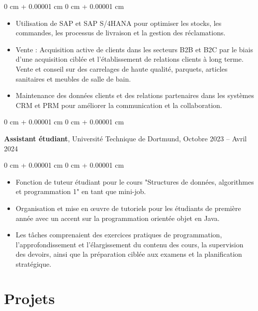 \documentclass[10pt, letterpaper]{article}
\newenvironment{highlights}{
    \begin{itemize}[
        topsep=0.10 cm,
        parsep=0.10 cm,
        partopsep=0pt,
        itemsep=0pt,
        leftmargin=0 cm + 10pt
    ]
}{
    \end{itemize}
} %
\newenvironment{onecolentry}{
    \begin{adjustwidth}{
        0 cm + 0.00001 cm
    }{
        0 cm + 0.00001 cm
    }
}{
    \end{adjustwidth}
} %
\newenvironment{twocolentry}[2][]{
    \onecolentry
    \def\secondColumn{#2}
    \setcolumnwidth{\fill, 4.5 cm}
    \begin{paracol}{2}
}{
    \switchcolumn \raggedleft \secondColumn
    \end{paracol}
    \endonecolentry
} %
\begin{document}
        \vspace{0.10 cm}
        \begin{onecolentry}
            \begin{highlights}
                \item Utilisation de SAP et SAP S/4HANA pour optimiser les stocks, les commandes, les processus de livraison et la gestion des réclamations.

               \item Vente : Acquisition active de clients dans les secteurs B2B et B2C par le biais d'une acquisition ciblée et l'établissement de relations clients à long terme. Vente et conseil sur des carrelages de haute qualité, parquets, articles sanitaires et meubles de salle de bain.

                \item Maintenance des données clients et des relations partenaires dans les systèmes CRM et PRM pour améliorer la communication et la collaboration.
            \end{highlights}
        \end{onecolentry}

        \vspace{1 cm}
 
        \begin{twocolentry}{
            Octobre 2023 – Avril 2024
        }
            \textbf{Assistant étudiant}, Université Technique de Dortmund, \end{twocolentry}

       \vspace{0.10 cm}
\begin{onecolentry}
    \begin{highlights}
        \item Fonction de tuteur étudiant pour le cours "Structures de données, algorithmes et programmation 1" en tant que mini-job.
        \item Organisation et mise en œuvre de tutoriels pour les étudiants de première année avec un accent sur la programmation orientée objet en Java.
        \item Les tâches comprenaient des exercices pratiques de programmation, l'approfondissement et l'élargissement du contenu des cours, la supervision des devoirs, ainsi que la préparation ciblée aux examens et la planification stratégique.
    \end{highlights}
\end{onecolentry}
    
\section{Projets}
\end{document}
